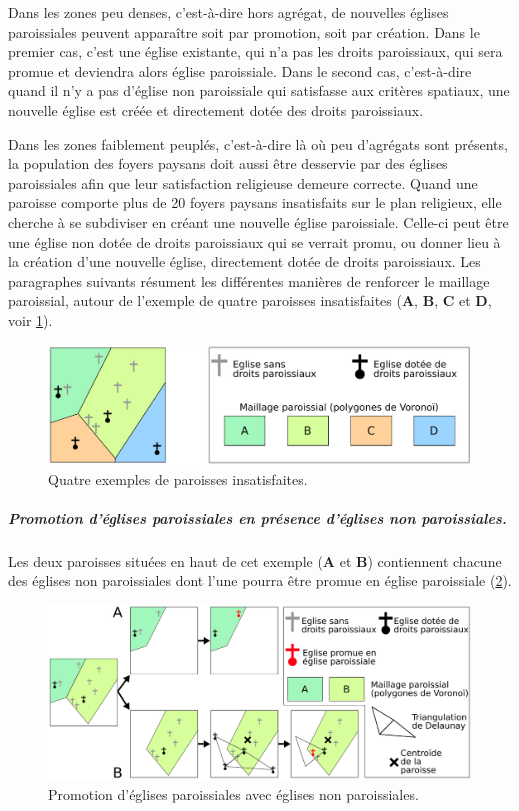 Dans les zones peu denses, c'est-à-dire hors agrégat, de nouvelles églises paroissiales peuvent apparaître soit par promotion, soit par création.
Dans le premier cas, c'est une église existante, qui n'a pas les droits paroissiaux, qui sera promue et deviendra alors église paroissiale.
Dans le second cas, c'est-à-dire quand il n'y a pas d'église non paroissiale qui satisfasse aux critères spatiaux, une nouvelle église est créée et directement dotée des droits paroissiaux.

Dans les zones faiblement peuplés, c'est-à-dire là où peu d'agrégats sont présents, la population des foyers paysans doit aussi être desservie par des églises paroissiales afin que leur satisfaction religieuse demeure correcte.
Quand une paroisse comporte plus de 20 foyers paysans insatisfaits sur le plan religieux, elle cherche à se subdiviser en créant une nouvelle église paroissiale.
Celle-ci peut être une église non dotée de droits paroissiaux qui se verrait promu, ou donner lieu à la création d'une nouvelle église, directement dotée de droits paroissiaux.
Les paragraphes suivants résument les différentes manières de renforcer le maillage paroissial, autour de l'exemple de quatre paroisses insatisfaites (\textbf{A}, \textbf{B}, \textbf{C} et \textbf{D}, voir \cref{fig:promotion-paroisses-base}).

\begin{figure}[H]
	\centering
	\includegraphics[width=1\linewidth]{img/promo_creation_paroisses_base.pdf}
	\caption{Quatre exemples de paroisses insatisfaites.}
	\label{fig:promotion-paroisses-base}
\end{figure}


\subparagraph{Promotion d'églises paroissiales en présence d'églises non paroissiales.}
Les deux paroisses situées en haut de cet exemple (\textbf{A} et \textbf{B}) contiennent chacune des églises non paroissiales dont l'une pourra être promue en église paroissiale (\cref{fig:promotion-paroisses-1}).

\begin{figure}[H]
	\centering
	\includegraphics[width=1\linewidth]{img/promo_creation_paroisses_promo1.pdf}
	\caption{Promotion d'églises paroissiales avec églises non paroissiales.}
	\label{fig:promotion-paroisses-1}
\end{figure}

